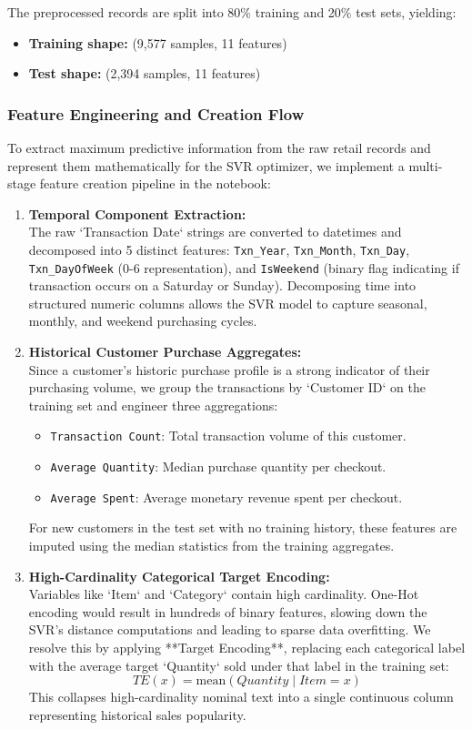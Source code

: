 \documentclass[12pt,a4paper]{article}
\begin{document}
The preprocessed records are split into 80\% training and 20\% test sets, yielding:
\begin{itemize}
    \item \textbf{Training shape:} (9,577 samples, 11 features)
    \item \textbf{Test shape:} (2,394 samples, 11 features)
\end{itemize}

\subsubsection{Feature Engineering and Creation Flow}
To extract maximum predictive information from the raw retail records and represent them mathematically for the SVR optimizer, we implement a multi-stage feature creation pipeline in the notebook:
\begin{enumerate}
    \item \textbf{Temporal Component Extraction:} \\
        The raw `Transaction Date` strings are converted to datetimes and decomposed into 5 distinct features: \texttt{Txn\_Year}, \texttt{Txn\_Month}, \texttt{Txn\_Day}, \texttt{Txn\_DayOfWeek} (0-6 representation), and \texttt{IsWeekend} (binary flag indicating if transaction occurs on a Saturday or Sunday). Decomposing time into structured numeric columns allows the SVR model to capture seasonal, monthly, and weekend purchasing cycles.
    \item \textbf{Historical Customer Purchase Aggregates:} \\
        Since a customer's historic purchase profile is a strong indicator of their purchasing volume, we group the transactions by `Customer ID` on the training set and engineer three aggregations:
        \begin{itemize}
            \item \texttt{Transaction\ Count}: Total transaction volume of this customer.
            \item \texttt{Average\ Quantity}: Median purchase quantity per checkout.
            \item \texttt{Average\ Spent}: Average monetary revenue spent per checkout.
        \end{itemize}
        For new customers in the test set with no training history, these features are imputed using the median statistics from the training aggregates.
    \item \textbf{High-Cardinality Categorical Target Encoding:} \\
        Variables like `Item` and `Category` contain high cardinality. One-Hot encoding would result in hundreds of binary features, slowing down the SVR's distance computations and leading to sparse data overfitting. We resolve this by applying **Target Encoding**, replacing each categorical label with the average target `Quantity` sold under that label in the training set:
        \[
        TE(x) = \text{mean}(Quantity \mid Item = x)
        \]
        This collapses high-cardinality nominal text into a single continuous column representing historical sales popularity.
\end{enumerate}
\end{document}
